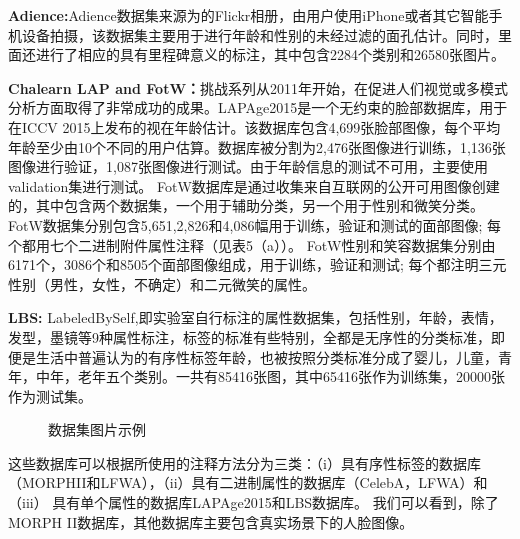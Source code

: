 \textbf{Adience:}\cite{ADIENCE}Adience数据集来源为的Flickr相册，由用户使用iPhone或者其它智能手机设备拍摄，该数据集主要用于进行年龄和性别的未经过滤的面孔估计。同时，里面还进行了相应的具有里程碑意义的标注，其中包含2284个类别和26580张图片。

\textbf{Chalearn LAP and FotW：}\cite{CHALEARN}挑战系列从2011年开始，在促进人们视觉或多模式分析方面取得了非常成功的成果。LAPAge2015是一个无约束的脸部数据库，用于在ICCV 2015上发布的视在年龄估计。该数据库包含4,699张脸部图像，每个平均年龄至少由10个不同的用户估算。数据库被分割为2,476张图像进行训练，1,136张图像进行验证，1,087张图像进行测试。由于年龄信息的测试不可用，主要使用validation集进行测试。 FotW数据库是通过收集来自互联网的公开可用图像创建的，其中包含两个数据集，一个用于辅助分类，另一个用于性别和微笑分类。 FotW数据集分别包含5,651,2,826和4,086幅用于训练，验证和测试的面部图像; 每个都用七个二进制附件属性注释（见表5（a））。 FotW性别和笑容数据集分别由6171个，3086个和8505个面部图像组成，用于训练，验证和测试; 每个都注明三元性别（男性，女性，不确定）和二元微笑的属性。

\textbf{LBS:} 
LabeledBySelf,即实验室自行标注的属性数据集，包括性别，年龄，表情，发型，墨镜等9种属性标注，标签的标准有些特别，全都是无序性的分类标准，即便是生活中普遍认为的有序性标签年龄，也被按照分类标准分成了婴儿，儿童，青年，中年，老年五个类别。一共有85416张图，其中65416张作为训练集，20000张作为测试集。

\begin{figure}[!ht]
 \centering 
	\caption{数据集图片示例}
\end{figure}
这些数据库可以根据所使用的注释方法分为三类：（i）具有序性标签的数据库（MORPHII和LFWA），（ii）具有二进制属性的数据库（CelebA，LFWA）和（iii） 具有单个属性的数据库LAPAge2015和LBS数据库。 我们可以看到，除了MORPH II数据库，其他数据库主要包含真实场景下的人脸图像。  

